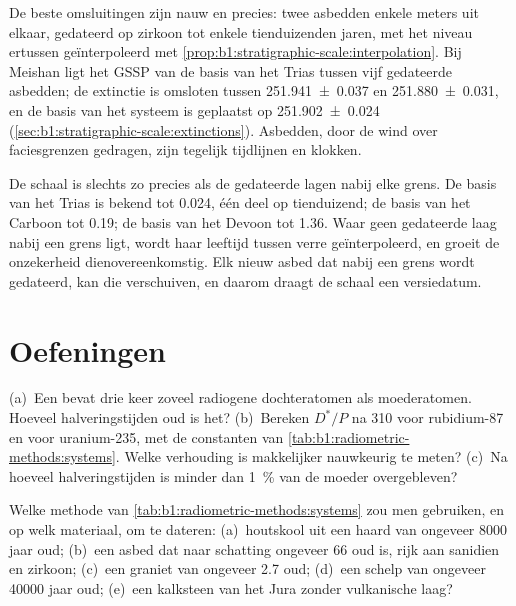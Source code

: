De beste omsluitingen zijn nauw en precies: twee asbedden enkele meters uit elkaar, gedateerd op zirkoon tot enkele tienduizenden jaren, met het niveau ertussen geïnterpoleerd met \cref{prop:b1:stratigraphic-scale:interpolation}. Bij Meishan ligt het GSSP van de basis van het Trias tussen vijf gedateerde asbedden; de extinctie is omsloten tussen \qty[uncertainty-mode=separate]{251.941(37)}{\Ma} en \qty[uncertainty-mode=separate]{251.880(31)}{\Ma}, en de basis van het systeem is geplaatst op \qty[uncertainty-mode=separate]{251.902(24)}{\Ma} (\cref{sec:b1:stratigraphic-scale:extinctions}). Asbedden, door de wind over faciesgrenzen gedragen, zijn tegelijk tijdlijnen en klokken.

De schaal is slechts zo precies als de gedateerde lagen nabij elke grens. De basis van het Trias is bekend tot \qty{0.024}{\Myr}, één deel op tienduizend; de basis van het Carboon tot \qty{0.19}{\Myr}; de basis van het Devoon tot \qty{1.36}{\Myr}. Waar geen gedateerde laag nabij een grens ligt, wordt haar leeftijd tussen verre geïnterpoleerd, en groeit de onzekerheid dienovereenkomstig. Elk nieuw asbed dat nabij een grens wordt gedateerd, kan die verschuiven, en daarom draagt de schaal een versiedatum.

\section{Oefeningen}

\begin{exercise}[$\star$]\label{exo:b1:radiometric-methods:1}
(a)~Een  bevat drie keer zoveel radiogene dochteratomen als moederatomen. Hoeveel halveringstijden oud is het? (b)~Bereken $D^*/P$ na \qty{310}{\Myr} voor rubidium-87 en voor uranium-235, met de constanten van \cref{tab:b1:radiometric-methods:systems}. Welke verhouding is makkelijker nauwkeurig te meten? (c)~Na hoeveel halveringstijden is minder dan \qty{1}{\percent} van de moeder overgebleven?
\end{exercise}

\begin{exercise}[$\star$]\label{exo:b1:radiometric-methods:2}
Welke methode van \cref{tab:b1:radiometric-methods:systems} zou men gebruiken, en op welk materiaal, om te dateren: (a)~houtskool uit een haard van ongeveer \num{8000} jaar oud; (b)~een asbed dat naar schatting ongeveer \qty{66}{\Ma} oud is, rijk aan sanidien en zirkoon; (c)~een graniet van ongeveer \qty{2.7}{\Ga} oud; (d)~een schelp van ongeveer \num{40000} jaar oud; (e)~een kalksteen van het Jura zonder vulkanische laag?
\end{exercise}

